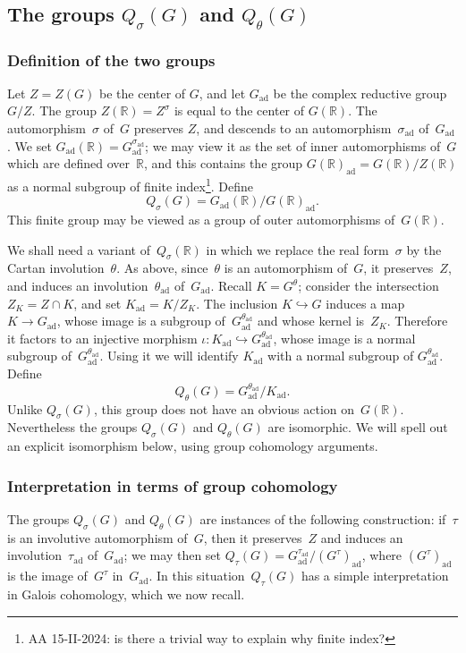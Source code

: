 \documentclass[10pt,leqno]{article}
\newcommand{\ad}{\mathrm{ad}}
\newcommand{\Gad}{G_\mathrm{ad}}
\newcommand{\Kad}{K_\mathrm{ad}}
\newcommand{\R}{\mathbb R}
\begin{document}
\subsection{The groups $Q_\sigma(G)$ and $Q_{\theta}(G)$}

\subsubsection{Definition of the two groups}Let $Z=Z(G)$ be the center of $G$, and let $\Gad$ be the complex reductive group~$G/Z$. The group $Z(\R)=Z^{\sigma}$ is equal to the center of $G(\R)$. The automorphism~$\sigma$ of~$G$ preserves $Z$, and descends to an automorphism~$\sigma_{\ad}$ of~$\Gad$. We set $\Gad(\R)=\Gad^{\sigma_{\ad}}$; we may view it as the set of inner automorphisms of~$G$ which are defined over~$\R$, and this contains the group $G(\R)_{\mathrm{ad}}=G(\R)/Z(\R)$ as a normal subgroup of finite index\footnote{AA 15-II-2024: is there a trivial way to explain why finite index?}.
Define 
$$
Q_\sigma(G)=\Gad(\R)/G(\R)_{\mathrm{ad}}.
$$
This finite group may be viewed as a group of outer automorphisms of~$G(\R)$. 

We shall need a variant of~$Q_{\sigma}(\R)$ in which we replace the real form~$\sigma$ by the Cartan involution~$\theta$. As above, since~$\theta$ is an automorphism of~$G$, it preserves~$Z$,  and induces an involution~$\theta_{\ad}$ of~$\Gad$. Recall $K=G^{\theta}$; consider the intersection $Z_K=Z \cap K$, and set  $K_{\ad}=K/Z_K$. The inclusion  $K \hookrightarrow G$ induces a map $K \to \Gad$, whose image is a subgroup of~$\Gad^{\theta_{\ad}}$ and whose kernel is~$Z_K$. Therefore it factors to an injective morphism $\iota\colon \Kad \hookrightarrow\Gad^{\theta_{\ad}} $, whose image is a normal subgroup of~$\Gad^{\theta_{\ad}}$. Using it we will identify $\Kad$ with a normal subgroup of $\Gad^{\theta_{\ad}}$. Define
\[ Q_\theta(G) = \Gad^{\theta_{\ad}}/\Kad.\]
Unlike $Q_{\sigma}(G)$, this group does not have an obvious action on~$G(\R)$. Nevertheless the groups $Q_{\sigma}(G)$ and $Q_{\theta}(G)$ are isomorphic. We will spell out an explicit isomorphism below, using group cohomology arguments.

\subsubsection{Interpretation in terms of group cohomology}

The groups $Q_{\sigma}(G)$ and $Q_{\theta}(G)$ are instances of the following construction: if~$\tau$ is an involutive automorphism of~$G$, then it preserves~$Z$ and induces an involution~$\tau_{\ad}$ of~$\Gad$; we may then set $Q_{\tau}(G)=\Gad^{\tau_{\ad}}/(G^{\tau})_{\ad}$, where $(G^{\tau})_{\ad}$ is the image of~$G^{\tau}$ in~$\Gad$. In this situation~$Q_{\tau}(G)$ has a simple interpretation in Galois cohomology, which we now recall. 
\end{document}
